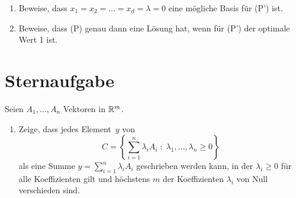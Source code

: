 \documentclass{uebung_cs}
\begin{document}
\begin{aufgabe}
	\begin{enumerate}
		\item Beweise, dass $x_1 = x_2 = \dots = x_d = \lambda = 0$ eine mögliche Basis für (P') ist.
		\item Beweise, dass (P) genau dann eine Lösung hat, wenn für (P') der optimale Wert 1 ist.
	\end{enumerate}
\end{aufgabe}


\section*{Sternaufgabe}

\begin{aufgabe}
%
	Seien $A_1,\dots , A_n$ Vektoren in $\mathbb{R}^m$.
	\begin{enumerate}
		\item Zeige, dass jedes Element~$y$ von 
			\[
				C=\left\{\sum_{i=1}^n \lambda_i A_i \;:\; \lambda_1, \dots , \lambda_n\geq 0\right\}
			\]
			als eine Summe $y=\sum_{i=1}^n \lambda_i A_i$ geschrieben werden kann, in der $\lambda_i\geq 0$ für alle Koeffizienten gilt und höchstens $m$ der Koeffizienten $\lambda_i$ von Null verschieden sind. 


\end{enumerate}
\end{aufgabe}
\end{document}
